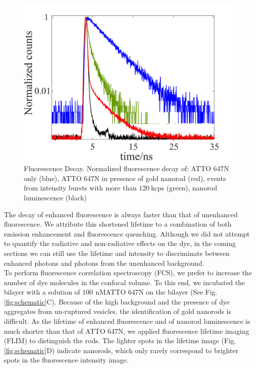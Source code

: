 \documentclass[journal=jacsat,manuscript=article]{achemso}
\newcommand{\nM}{\ensuremath{\,\textrm{nM}}}
\begin{document}
\begin{figure}
	\centering
	\includegraphics[]{lifetime_enhnc.png}
	\caption{Fluorescence Decay. Normalized fluorescence decay of: ATTO 647N only (blue), ATTO 647N in presence of gold nanorod (red), events from intensity bursts with more than $120~$kcps (green), nanorod luminescence (black)}
	\label{fig:lifetime_enhnc}
\end{figure}
The decay of enhanced fluorescence is always faster than that of unenhanced fluorescence. We attribute this shortened lifetime to a combination of both emission enhancement and fluorescence quenching. Although we did not attempt to quantify the radiative and non-radiative effects on the dye, in the coming sections we can still use the lifetime and intensity to discriminate between enhanced photons and photons from the unenhanced background.\\
To perform fluorescence correlation spectroscopy (FCS), we prefer to increase the number of dye molecules in the confocal volume. To this end, we incubated the bilayer with a solution of $100~$\nM ATTO 647N on the bilayer (See Fig. \ref{fig:schematic}C). Because of the high background and the presence of dye aggregates from un-ruptured vesicles, the identification of gold nanorods is difficult. As the lifetime of enhanced fluorescence and of nanorod luminescence is much shorter than that of ATTO 647N, we applied fluorescence lifetime imaging (FLIM) to distinguish the rods. The lighter spots in the lifetime image (Fig.\ref{fig:schematic}D) indicate nanorods, which only rarely correspond to brighter spots in the fluorescence intensity image.\\
\end{document}
